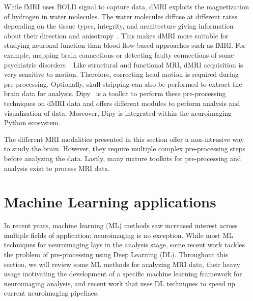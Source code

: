 While fMRI uses BOLD signal to capture data, dMRI exploits the magnetization of hydrogen in water molecules.
The water molecules diffuse at different rates depending on the tissue types,
integrity, and architecture giving information about their direction and anisotropy~\cite{Soares2013-hw}.
This makes dMRI more suitable for studying neuronal function than blood-flow-based approaches such as fMRI.
For example, mapping brain connections or detecting faulty connections of some psychiatric disorders~\cite{Le_Bihan2015-vp}.
Like structural and functional MRI, dMRI acquisition is very sensitive to motion.
Therefore, correcting head motion is required during pre-processing.
Optionally, skull stripping can also be performed to extract the brain data for analysis.
Dipy~\cite{Garyfallidis2014-ve} is a toolkit to perform these pre-processing techniques
on dMRI data and offers different modules to perform analysis and visualization of data.
Moreover, Dipy is integrated within the neuroimaging Python ecosystem.

The different MRI modalities presented in this section offer a non-intrusive way
to study the brain. However, they require multiple complex pre-processing steps before analyzing the data.
Lastly, many mature toolkits for pre-processing and analysis exist to process MRI data.

\section{Machine Learning applications} %
In recent years, machine learning (ML) methods saw increased interest across
multiple fields of application; neuroimaging is no exception.
While most ML techniques for neuroimaging lays in the analysis stage, some recent
work tackles the problem of pre-processing using Deep Learning (DL).
Throughout this section, we will review some ML methods for analyzing MRI
data, their heavy usage motivating the development of a specific machine learning
framework for neuroimaging analysis, and recent work that uses DL techniques to
speed up current neuroimaging pipelines.

